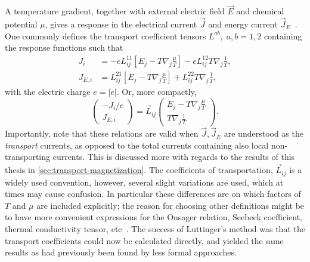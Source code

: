 A temperature gradient, together with external electric field $\vec{E}$ and chemical potential $\mu$, gives a response in the electrical current $\vec{J}$ and energy current $\vec{J}_E$~\cite{mahanManyparticlePhysics2000}.
One commonly defines the transport coefficient tensors \( L^{ab},\; a,b=1,2 \) containing the response functions such that
\begin{align}
\label{eq:17}
  J_{i} &= -e L^{11}_{ij} \left[
          E_j - T \nabla_j \frac{\mu}{T}
  \right]
  - e L^{12}_{ij} T \nabla_j \frac{1}{T},\\
  J_{E,i} &= L^{21}_{ij} \left[
          E_j - T \nabla_j \frac{\mu}{T}
  \right]
  + L^{22}_{ij} T \nabla_j \frac{1}{T},
\end{align}
with the electric charge \( e = |e| \).
Or, more compactly,
\begin{equation}
  \begin{pmatrix}
    -J_{i} /e \\ J_{E,i }
  \end{pmatrix}
  =
  \vec{L}_{ij}
  \begin{pmatrix}
    E_j - T \nabla_j \frac{\mu}{T}\\
    T \nabla_j \frac{1}{T}
  \end{pmatrix}.
\end{equation}
Importantly, note that these relations are valid when \( \vec{J}, \vec{J}_E \) are understood as the \emph{transport} currents, as opposed to the total currents containing also local non-transporting currents.
This is discussed more with regards to the results of this thesis in \cref{sec:transport-magnetization}.
The coefficients of transportation, $\vec{L}_{ij}$ is a widely used convention, however, several slight variations are used, which at times may cause confusion.
In particular these differences are on which factors of \( T \) and \( \mu \) are included explicitly;
the reason for choosing other definitions might be to have more convenient expressions for the Onsager relation, Seebeck coefficient, thermal conductivity tensor, etc~\cites{mahanManyparticlePhysics2000,chernodubThermalTransportGeometry2021,lundgrenThermoelectricPropertiesWeyl2014}.
The success of Luttinger's method was that the transport coefficients could now be calculated directly, and yielded the same results as had previously been found by less formal approaches.

